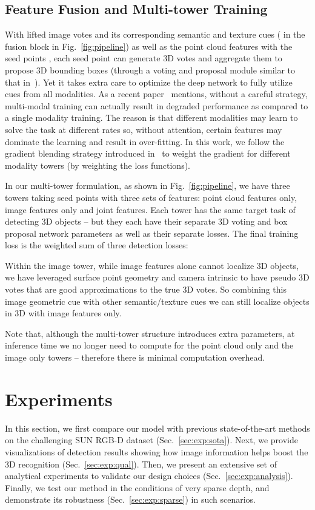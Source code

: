 \documentclass[10pt,twocolumn,letterpaper]{article}
\begin{document}
\subsection{Feature Fusion and Multi-tower Training}
With lifted image votes and its corresponding semantic and texture cues ( in the fusion block in Fig.~\ref{fig:pipeline}) as well as the point cloud features with the seed points , each seed point can generate 3D votes and aggregate them to propose 3D bounding boxes (through a voting and proposal module similar to that in~\cite{voteNet}). 
Yet it takes extra care to optimize the deep network to fully utilize cues from all modalities. As a recent paper~\cite{wang2019makes} mentions, without a careful strategy, multi-modal training can actually result in degraded performance as compared to a single modality training. The reason is that different modalities may learn to solve the task at different rates so, without attention, certain features may dominate the learning and result in over-fitting. In this work, we follow the gradient blending strategy introduced in~\cite{wang2019makes} to weight the gradient for different modality towers (by weighting the loss functions).

In our multi-tower formulation, as shown in Fig.~\ref{fig:pipeline}, we have three towers taking seed points with three sets of features: point cloud features only, image features only and joint features. Each tower has the same target task of detecting 3D objects -- but they each have their separate 3D voting and box proposal network parameters as well as their separate losses. The final training loss is the weighted sum of three detection losses:



Within the image tower, while image features alone cannot localize 3D objects, we have leveraged surface point geometry and camera intrinsic to have pseudo 3D votes that are good approximations to the true 3D votes. So combining this image geometric cue with other semantic/texture cues we can still localize objects in 3D with image features only.

Note that, although the multi-tower structure introduces extra parameters, at inference time we no longer need to compute for the point cloud only and the image only towers -- therefore there is minimal computation overhead.
 
\section{Experiments}
In this section, we first compare our model with previous state-of-the-art methods on the challenging SUN RGB-D dataset (Sec.~\ref{sec:exp:sota}). Next, we provide visualizations of detection results showing how image information helps boost the 3D recognition (Sec.~\ref{sec:exp:qual}). Then, we present an extensive set of analytical experiments to validate our design choices (Sec.~\ref{sec:exp:analysis}). Finally, we test our method in the conditions of very sparse depth, and demonstrate its robustness (Sec.~\ref{sec:exp:sparse}) in such scenarios.
\end{document}
